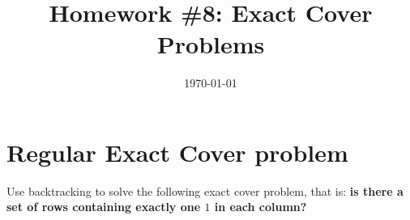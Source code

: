 \documentclass[table]{article}
\title{Homework \#8: Exact Cover Problems}
\date{\today}
\begin{document}
\maketitle

\section{Regular Exact Cover problem}

Use backtracking to solve the following exact cover problem, that is: {\bf is there a set of rows containing exactly one $1$ in each column?}
\vspace{1em}

%
%	
%
\vspace{2em}
\end{document}
